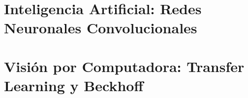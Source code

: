 

\renewcommand{\partname}{Parte}
\renewcommand{\thepart}{\arabic{part}}




\indicepucp
\thispagestyle{fancy}
\newpage

\clearpage
\part{Inteligencia Artificial: Redes Neuronales Convolucionales}


\clearpage
\part{Visión por Computadora: Transfer Learning y Beckhoff}



